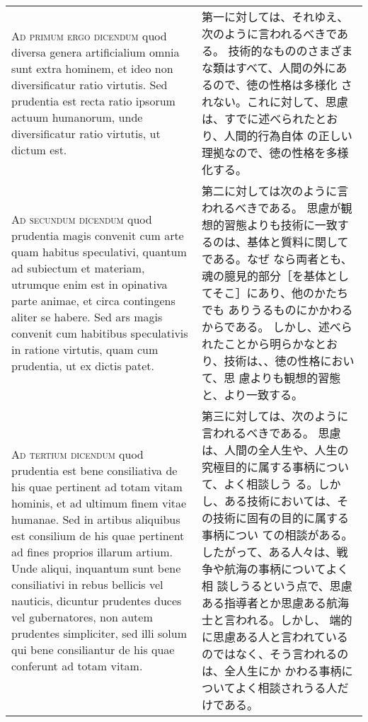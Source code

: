 \documentclass[10pt]{jsarticle} %
\begin{document}
\begin{longtable}{p{21em}p{21em}}
{\scshape Ad primum ergo dicendum} quod diversa
 genera artificialium omnia sunt extra hominem, et ideo non
 diversificatur ratio virtutis. Sed prudentia est recta ratio ipsorum
 actuum humanorum, unde diversificatur ratio virtutis, ut dictum est.


&
第一に対しては、それゆえ、次のように言われるべきである。
技術的なもののさまざまな類はすべて、人間の外にあるので、徳の性格は多様化
 されない。これに対して、思慮は、すでに述べられたとおり、人間的行為自体
 の正しい理拠なので、徳の性格を多様化する。

\\



{\scshape Ad secundum dicendum} quod prudentia
 magis convenit cum arte quam habitus speculativi, quantum ad subiectum
 et materiam, utrumque enim est in opinativa parte animae, et circa
 contingens aliter se habere. Sed ars magis convenit cum habitibus
 speculativis in ratione virtutis, quam cum prudentia, ut ex dictis
 patet.


&

第二に対しては次のように言われるべきである。
思慮が観想的習態よりも技術に一致するのは、基体と質料に関してである。なぜ
 なら両者とも、魂の臆見的部分［を基体としてそこ］にあり、他のかたちでも
 ありうるものにかかわるからである。
しかし、述べられたことから明らかなとおり、技術は、、徳の性格において、思
 慮よりも観想的習態と、より一致する。


\\



{\scshape Ad tertium dicendum} quod prudentia est
 bene consiliativa de his quae pertinent ad totam vitam hominis, et ad
 ultimum finem vitae humanae. Sed in artibus aliquibus est consilium de
 his quae pertinent ad fines proprios illarum artium. Unde aliqui,
 inquantum sunt bene consiliativi in rebus bellicis vel nauticis,
 dicuntur prudentes duces vel gubernatores, non autem prudentes
 simpliciter, sed illi solum qui bene consiliantur de his quae conferunt
 ad totam vitam.

&

第三に対しては、次のように言われるべきである。
思慮は、人間の全人生や、人生の究極目的に属する事柄について、よく相談しう
 る。しかし、ある技術においては、その技術に固有の目的に属する事柄につい
 ての相談がある。したがって、ある人々は、戦争や航海の事柄についてよく相
 談しうるという点で、思慮ある指導者とか思慮ある航海士と言われる。しかし、
 端的に思慮ある人と言われているのではなく、そう言われるのは、全人生にか
 かわる事柄についてよく相談されうる人だけである。



\end{longtable}
\newpage
\end{document}
